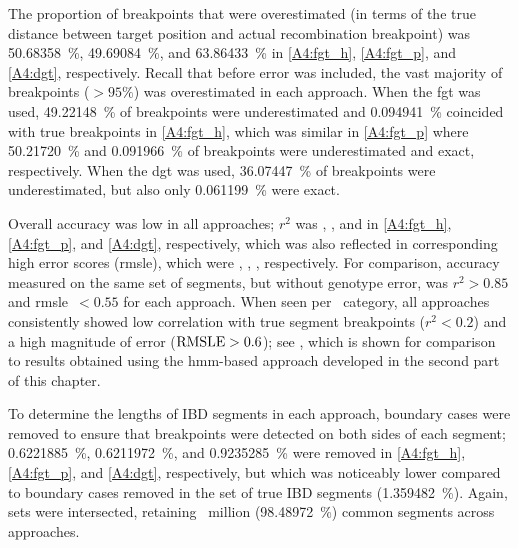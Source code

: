 %

%

The proportion of breakpoints that were overestimated (in terms of the true distance between target position and actual recombination breakpoint) was
\SI{50.68358}{\percent}, \SI{49.69084}{\percent}, and \SI{63.86433}{\percent} in \ref{A4:fgt_h}, \ref{A4:fgt_p}, and \ref{A4:dgt}, respectively.
Recall that before error was included, the vast majority of breakpoints (${>95\%}$) was overestimated in each approach.
When the \gls{fgt} was used, \SI{49.22148}{\percent} of breakpoints were underestimated and \SI{0.094941}{\percent} coincided with true breakpoints in \cref{A4:fgt_h}, which was similar in \cref{A4:fgt_p} where \SI{50.21720}{\percent} and \SI{0.091966}{\percent} of breakpoints were underestimated and exact, respectively.
When the \gls{dgt} was used, \SI{36.07447}{\percent} of breakpoints were underestimated, but also only \SI{0.061199}{\percent} were exact.

Overall accuracy was low in all approaches; $r^2$ was , , and  in \ref{A4:fgt_h}, \ref{A4:fgt_p}, and \ref{A4:dgt}, respectively, which was also reflected in corresponding high error scores (\gls{rmsle}), which were , , , respectively.
For comparison, accuracy measured on the same set of segments, but without genotype error, was ${r^2 > 0.85}$ and \gls{rmsle}~${< 0.55}$ for each approach.
When seen per \fk{}~category, all  approaches consistently showed low correlation with true segment breakpoints (${r^2 < 0.2}$) and a high magnitude of error (${\operatorname*{RMSLE} > 0.6}$); see , which is shown for comparison to results obtained using the \gls{hmm}-based approach developed in the second part of this chapter.

To determine the lengths of IBD segments in each approach, boundary cases were removed to ensure that breakpoints were detected on both sides of each segment; \SI{0.6221885}{\percent}, \SI{0.6211972}{\percent}, and \SI{0.9235285}{\percent} were removed in \ref{A4:fgt_h}, \ref{A4:fgt_p}, and \ref{A4:dgt}, respectively, but which was noticeably lower compared to boundary cases removed in the set of true IBD segments (\SI{1.359482}{\percent}).
Again, sets were intersected, retaining ~million (\SI{98.48972}{\percent}) common segments across approaches.

%

%

